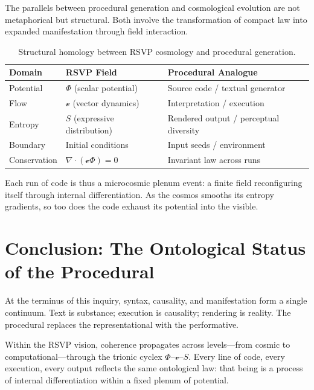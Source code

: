 \documentclass[12pt,a4paper]{article}
\theoremstyle{plain}
\theoremstyle{definition}
\theoremstyle{remark}
\newcommand{\Phifield}{\Phi}
\newcommand{\vfield}{\mathcal{v}}
\newcommand{\Sfield}{S}
\begin{document}
The parallels between procedural generation and cosmological evolution are not metaphorical but structural. Both involve the transformation of compact law into expanded manifestation through field interaction.

\begin{table}[H]
\centering
\renewcommand{\arraystretch}{1.15}
\begin{tabular}{>{\RaggedRight}p{3.8cm} >{\RaggedRight}p{4.0cm} >{\RaggedRight\arraybackslash}p{6.6cm}}
\toprule
\textbf{Domain} & \textbf{RSVP Field} & \textbf{Procedural Analogue} \\
\midrule
Potential & $\Phifield$ (scalar potential) & Source code / textual generator \\
Flow & $\vfield$ (vector dynamics) & Interpretation / execution \\
Entropy & $\Sfield$ (expressive distribution) & Rendered output / perceptual diversity \\
Boundary & Initial conditions & Input seeds / environment \\
Conservation & $\nabla \cdot (\vfield \Phifield) = 0$ & Invariant law across runs \\
\bottomrule
\end{tabular}
\caption{Structural homology between RSVP cosmology and procedural generation.}
\end{table}

Each run of code is thus a microcosmic plenum event: a finite field reconfiguring itself through internal differentiation. As the cosmos smooths its entropy gradients, so too does the code exhaust its potential into the visible.

\section{Conclusion: The Ontological Status of the Procedural}
\label{sec:conclusion}

At the terminus of this inquiry, syntax, causality, and manifestation form a single continuum. Text is substance; execution is causality; rendering is reality. The procedural replaces the representational with the performative.

Within the RSVP vision, coherence propagates across levels—from cosmic to computational—through the trionic cyclex $\Phifield$–$\vfield$–$\Sfield$. Every line of code, every execution, every output reflects the same ontological law: that being is a process of internal differentiation within a fixed plenum of potential.
\end{document}
